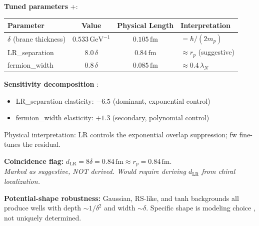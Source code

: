 \begin{tcolorbox}[breakable, enhanced, colback=green!5!white, colframe=green!60!black,
    title={\textbf{BVP Pipeline: All Gates Pass (OPR-21b/c)}}, width=\linewidth]
\vspace{0.5em}
\textbf{Tuned parameters} \tagDc{}+\tagCal{}:
\begin{center}
\begin{tabular}{lccl}
\toprule
\textbf{Parameter} & \textbf{Value} & \textbf{Physical Length} & \textbf{Interpretation} \\
\midrule
$\delta$ (brane thickness) & $0.533\,\text{GeV}^{-1}$ & $0.105\,\text{fm}$ & $= \hbar/(2m_p)$ \tagDc{} \\
LR\_separation & $8.0\,\delta$ & $0.84\,\text{fm}$ & $\approx r_p$ (suggestive) \\
fermion\_width & $0.8\,\delta$ & $0.085\,\text{fm}$ & $\approx 0.4\,\lambda_N$ \\
\bottomrule
\end{tabular}
\end{center}

\vspace{0.5em}
\textbf{Sensitivity decomposition} \tagDer{}:
\begin{itemize}[nosep]
    \item LR\_separation elasticity: $-6.5$ (dominant, exponential control)
    \item fermion\_width elasticity: $+1.3$ (secondary, polynomial control)
\end{itemize}
Physical interpretation: LR controls the exponential overlap suppression; fw fine-tunes the residual.

\vspace{0.5em}
\textbf{Coincidence flag:} $d_{\text{LR}} = 8\delta = 0.84\,\text{fm} \approx r_p = 0.84\,\text{fm}$.\\
\textit{Marked as suggestive, NOT derived. Would require deriving $d_{\text{LR}}$ from chiral localization.}

\vspace{0.5em}
\textbf{Potential-shape robustness:} Gaussian, RS-like, and tanh backgrounds all produce wells with depth $\sim 1/\delta^2$ and width $\sim \delta$. Specific shape is modeling choice \tagDc{}, not uniquely determined.

\end{tcolorbox}



